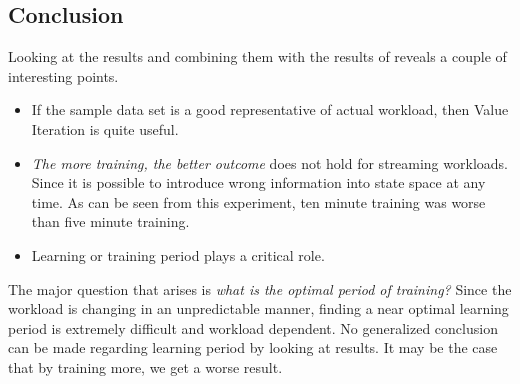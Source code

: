 \subsection{Conclusion}
Looking at the results and combining them with the results of \textcite{dutreilh:hal-01122123} reveals a couple of interesting points.
\begin{itemize}
    \item If the sample data set is a good representative of actual workload, then Value Iteration is quite useful.
    \item \emph{The more training, the better outcome} does not hold for streaming workloads. Since it is possible to introduce wrong information into state space at any time. As can be seen from this experiment, ten minute training was worse than five minute training.
    \item Learning or training period plays a critical role.
\end{itemize}
The major question that arises is \emph{what is the optimal period of training?} Since the workload is changing in an unpredictable manner, finding a near optimal learning period is extremely difficult and workload dependent. No generalized conclusion can be made regarding learning period by looking at results. It may be the case that by training more, we get a worse result.

\clearpage
